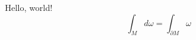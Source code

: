 \documentclass[a4paper, 12pt]{article}
\begin{document}
    Hello, world!
    $$
        \int_M d\omega = \int_{\partial M} \omega
    $$
\end{document}
